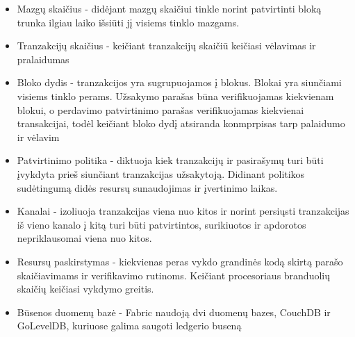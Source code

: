\documentclass{VUMIFPSkursinis}
\begin{document}
			\begin{itemize}
				\item{Mazgų skaičius - didėjant mazgų skaičiui tinkle norint patvirtinti bloką trunka ilgiau laiko išsiūti jį visiems tinklo mazgams.}
				\item{Tranzakcijų skaičius - keičiant tranzakcijų skaičiū keičiasi vėlavimas ir pralaidumas}
				\item{Bloko dydis - tranzakcijos yra sugrupuojamos į blokus. Blokai yra siunčiami visiems tinklo perams. Užsakymo parašas 
būna verifikuojamas kiekvienam blokui, o perdavimo patvirtinimo parašas verifikuojamas kiekvienai transakcijai, todėl keičiant bloko dydį atsiranda konmprpisas tarp palaidumo ir vėlavim}
				\item{Patvirtinimo politika - diktuoja kiek tranzakcijų ir pasirašymų turi būti įvykdyta prieš siunčiant tranzakcijas užsakytoją. Didinant politikos sudėtingumą didės resursų sunaudojimas ir įvertinimo laikas.}
				\item{Kanalai - izoliuoja tranzakcijas viena nuo kitos ir norint persiųsti tranzakcijas iš vieno kanalo į kitą turi būti patvirtintos, surikiuotos ir apdorotos nepriklausomai viena nuo kitos.}
				\item{Resursų paskirstymas - kiekvienas peras vykdo grandinės kodą skirtą parašo skaičiavimams ir verifikavimo rutinoms. Keičiant procesoriaus branduolių skaičių keičiasi vykdymo greitis.}
				\item{Būsenos duomenų bazė - Fabric naudoją dvi duomenų bazes, CouchDB ir GoLevelDB, kuriuose galima saugoti ledgerio buseną}
			\end{itemize}
\end{document}
